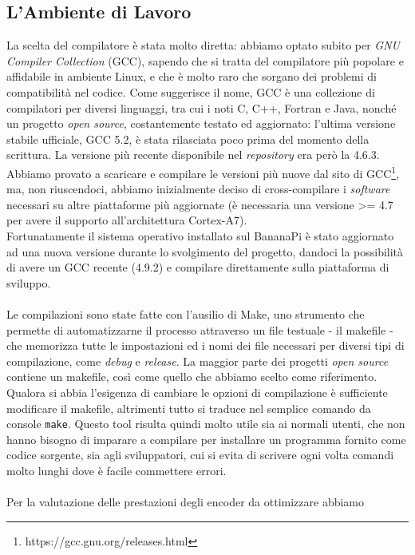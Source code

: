 \subsection{L'Ambiente di Lavoro}
La scelta del compilatore è stata molto diretta: abbiamo 
optato subito per 
\emph{GNU Compiler Collection} (GCC), sapendo che si tratta del compilatore più 
popolare e affidabile in ambiente Linux, e che è molto raro che sorgano dei 
problemi di compatibilità nel codice. Come suggerisce il nome, GCC è una 
collezione di compilatori per diversi linguaggi, tra cui i noti C, C++, Fortran 
e Java, nonché un progetto \emph{open source}, costantemente testato ed 
aggiornato: 
l'ultima versione stabile ufficiale, GCC 5.2, è stata rilasciata poco prima 
del momento della scrittura. La versione più recente disponibile nel 
\emph{repository} era però la 4.6.3. Abbiamo provato a 
scaricare e compilare le versioni più nuove dal sito di 
GCC\footnote{https://gcc.gnu.org/releases.html}, ma, non riuscendoci, abbiamo
inizialmente deciso di cross-compilare i \emph{software} necessari su altre
piattaforme più aggiornate (è necessaria una versione >= 4.7 per avere il
supporto all'architettura Cortex-A7). \\
Fortunatamente il sistema operativo installato sul BananaPi è stato aggiornato
ad una nuova versione durante lo svolgimento del progetto, dandoci la 
possibilità di avere un GCC recente (4.9.2) e compilare direttamente sulla
piattaforma di sviluppo.
\\ \\
Le compilazioni sono state fatte con l'ausilio di Make, 
uno strumento 
che permette di automatizzarne il processo attraverso un file 
testuale - il makefile - che memorizza tutte le impostazioni ed i nomi dei file 
necessari per diversi tipi di compilazione, come \emph{debug} e \emph{release}. 
La maggior 
parte dei progetti \emph{open source} contiene un makefile, così come quello 
che 
abbiamo scelto come riferimento. Qualora si abbia l'esigenza di cambiare le 
opzioni di 
compilazione è sufficiente modificare il makefile, altrimenti tutto si traduce 
nel semplice comando da console \verb|make|. Questo tool risulta quindi molto 
utile sia ai normali utenti, che non hanno bisogno di imparare a compilare per 
installare un 
programma fornito come codice sorgente, sia agli sviluppatori, cui 
si evita di scrivere ogni volta 
comandi molto lunghi dove è facile commettere errori.
\\ \\
Per la valutazione delle prestazioni degli encoder da ottimizzare abbiamo 
